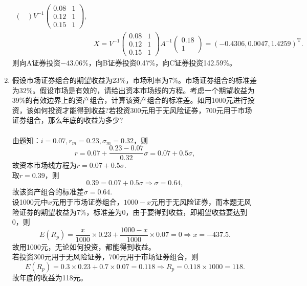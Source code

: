 \begin{enumerate}
\begin{align*}
\begin{pmatrix}
        \end{pmatrix}V^{-1}\begin{pmatrix}
            0.08 & 1\\0.12 & 1\\0.15 & 1
        \end{pmatrix},\\
        & X=V^{-1}\begin{pmatrix}
            0.08 & 1\\0.12 & 1\\0.15 & 1
        \end{pmatrix}A^{-1}\begin{pmatrix}
            0.18\\1
        \end{pmatrix}=(-0.4306,0.0047,1.4259)^{\mathrm{T}}.
    \end{align*}
    则向A证券投资$-43.06\%$，向B证券投资0.47\%，向C证券投资142.59\%。
    \item 假设市场证券组合的期望收益为23\%，市场利率为7\%。市场证券组合的标准差为32\%。假设市场是有效的，请给出资本市场线的方程。考虑一个期望收益为39\%的有效边界上的资产组合，计算该资产组合的标准差。如用1000元进行投资，该如何投资才能得到收益?若投资300元用于无风险证券，700元用于市场证券组合，那么年底的收益为多少?\\
    \sol\\
    由题知：$i=0.07,r_m=0.23,\sigma_m=0.32$，则
    \[r=0.07+\frac{0.23-0.07}{0.32}\sigma=0.07+0.5\sigma,\]
    故资本市场线方程为$r=0.07+0.5\sigma.$\\
    取$r=0.39$，则
    \[0.39=0.07+0.5\sigma \Rightarrow \sigma = 0.64,\]
    故该资产组合的标准差$\sigma = 0.64.$\\
    设1000元中$x$元用于市场证券组合，$1000-x$元用于无风险证券，而本题无风险证券的期望收益为7\%，标准差为0，由于要得到收益，即期望收益要达到0，则
    \[E(R_p) = \frac{x}{1000} \times 0.23 + \frac{1000-x}{1000} \times 0.07 = 0 \Rightarrow x = -437.5.\]
    故用1000元，无论如何投资，都能得到收益。\\
    若投资300元用于无风险证券，700元用于市场证券组合，则
    \[E(R_p) = 0.3 \times 0.23 + 0.7 \times 0.07 = 0.118 \Rightarrow R_p = 0.118 \times 1000 = 118.\]
    故年底的收益为118元。
\end{enumerate}
\clearpage